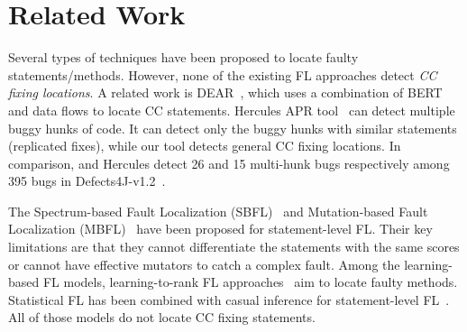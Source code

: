 \section{Related Work}

\vspace{2pt}

Several types of techniques have been proposed to locate faulty
statements/methods. However, none of the existing FL approaches detect
{\em CC fixing locations}.
A related work is DEAR~\cite{icse22}, which uses a combination
of BERT and data flows to locate CC statements.
Hercules APR tool~\cite{hercules-icse19} can detect multiple buggy
hunks of code. It can detect only the buggy hunks with similar
statements (replicated fixes), while our tool detects general CC
fixing locations. In comparison, {\tool} and Hercules detect 26 and 15
multi-hunk bugs respectively among 395 bugs in
Defects4J-v1.2~\cite{hercules-icse19}.


The Spectrum-based Fault Localization
(SBFL)~\cite{zhang2011localizing, abreu2007accuracy,
  jones2005empirical, abreu2006evaluation, naish2011model,
  wong2007effective, liblit-pldi05, lucia2014extended} and
Mutation-based Fault Localization (MBFL)~\cite{Metallaxis, MUSE,
  zhang2013injecting, budd1981mutation, zhang2010test, musco2017large}
have been proposed for statement-level FL. Their key limitations are
that they cannot differentiate the statements with the same scores or
cannot have effective mutators to catch a complex fault.
Among the learning-based FL models, learning-to-rank FL
approaches~\cite{MULTRIC,TraPT,b2016learning,sohn2017fluccs} aim to
locate faulty methods.
Statistical FL has been combined with casual inference for
statement-level FL~\cite{kuccuk2021improving}. All of those models
do not locate CC fixing statements.

